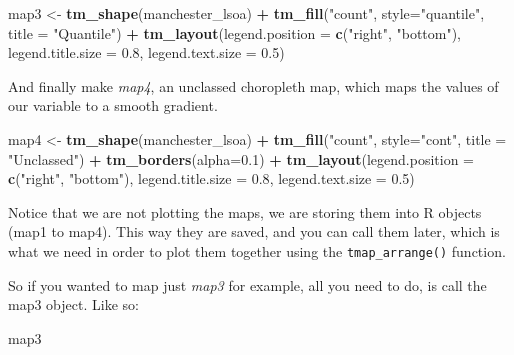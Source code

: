 \documentclass[]{book}
\newenvironment{Shaded}{\begin{snugshade}}{\end{snugshade}}
\newcommand{\DataTypeTok}[1]{\textcolor[rgb]{0.13,0.29,0.53}{#1}}
\newcommand{\FloatTok}[1]{\textcolor[rgb]{0.00,0.00,0.81}{#1}}
\newcommand{\KeywordTok}[1]{\textcolor[rgb]{0.13,0.29,0.53}{\textbf{#1}}}
\newcommand{\NormalTok}[1]{#1}
\newcommand{\OperatorTok}[1]{\textcolor[rgb]{0.81,0.36,0.00}{\textbf{#1}}}
\newcommand{\StringTok}[1]{\textcolor[rgb]{0.31,0.60,0.02}{#1}}
\begin{document}
\begin{Shaded}
\begin{Highlighting}[]
\NormalTok{map3 <-}\StringTok{ }\KeywordTok{tm_shape}\NormalTok{(manchester_lsoa) }\OperatorTok{+}\StringTok{ }
\StringTok{  }\KeywordTok{tm_fill}\NormalTok{(}\StringTok{"count"}\NormalTok{, }\DataTypeTok{style=}\StringTok{"quantile"}\NormalTok{, }\DataTypeTok{title =} \StringTok{"Quantile"}\NormalTok{) }\OperatorTok{+}
\StringTok{  }\KeywordTok{tm_layout}\NormalTok{(}\DataTypeTok{legend.position =} \KeywordTok{c}\NormalTok{(}\StringTok{"right"}\NormalTok{, }\StringTok{"bottom"}\NormalTok{), }
            \DataTypeTok{legend.title.size =} \FloatTok{0.8}\NormalTok{,}
            \DataTypeTok{legend.text.size =} \FloatTok{0.5}\NormalTok{)}
\end{Highlighting}
\end{Shaded}

And finally make \emph{map4}, an unclassed choropleth map, which maps the values of our variable to a smooth gradient.

\begin{Shaded}
\begin{Highlighting}[]
\NormalTok{map4 <-}\StringTok{ }\KeywordTok{tm_shape}\NormalTok{(manchester_lsoa) }\OperatorTok{+}\StringTok{ }
\StringTok{  }\KeywordTok{tm_fill}\NormalTok{(}\StringTok{"count"}\NormalTok{, }\DataTypeTok{style=}\StringTok{"cont"}\NormalTok{, }\DataTypeTok{title =} \StringTok{"Unclassed"}\NormalTok{) }\OperatorTok{+}
\StringTok{  }\KeywordTok{tm_borders}\NormalTok{(}\DataTypeTok{alpha=}\FloatTok{0.1}\NormalTok{) }\OperatorTok{+}
\StringTok{  }\KeywordTok{tm_layout}\NormalTok{(}\DataTypeTok{legend.position =} \KeywordTok{c}\NormalTok{(}\StringTok{"right"}\NormalTok{, }\StringTok{"bottom"}\NormalTok{), }
            \DataTypeTok{legend.title.size =} \FloatTok{0.8}\NormalTok{,}
            \DataTypeTok{legend.text.size =} \FloatTok{0.5}\NormalTok{)}
\end{Highlighting}
\end{Shaded}

Notice that we are not plotting the maps, we are storing them into R objects (map1 to map4). This way they are saved, and you can call them later, which is what we need in order to plot them together using the \texttt{tmap\_arrange()} function.

So if you wanted to map just \emph{map3} for example, all you need to do, is call the map3 object. Like so:

\begin{Shaded}
\begin{Highlighting}[]
\NormalTok{map3}
\end{Highlighting}
\end{Shaded}
\end{document}
